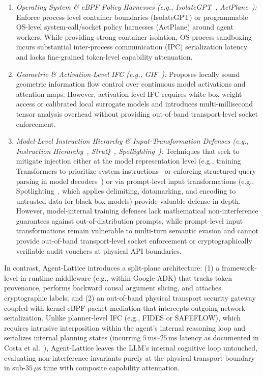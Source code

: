 \documentclass[conference,10pt]{IEEEtran}
\begin{document}
\begin{itemize}
\begin{enumerate}
        \item \textit{Operating System \& eBPF Policy Harnesses (e.g., IsolateGPT~\cite{isolategpt2025}, ActPlane~\cite{zheng2026actplane}):} Enforce process-level container boundaries (IsolateGPT) or programmable OS-level system-call/socket policy harnesses (ActPlane) around agent workers. While providing strong container isolation, OS process sandboxing incurs substantial inter-process communication (IPC) serialization latency and lacks fine-grained token-level capability attenuation.
        \item \textit{Geometric \& Activation-Level IFC (e.g., GIF~\cite{storek2026gif}):} Proposes locally sound geometric information flow control over continuous model activations and attention maps. However, activation-level IFC requires white-box weight access or calibrated local surrogate models and introduces multi-millisecond tensor analysis overhead without providing out-of-band transport-level socket enforcement.
        \item \textit{Model-Level Instruction Hierarchy \& Input-Transformation Defenses (e.g., Instruction Hierarchy~\cite{wallace2024instruction}, StruQ~\cite{chen2024struq}, Spotlighting~\cite{hines2024spotlighting}):} Techniques that seek to mitigate injection either at the model representation level (e.g., training Transformers to prioritize system instructions~\cite{wallace2024instruction} or enforcing structured query parsing in model decoders~\cite{chen2024struq}) or via prompt-level input transformations (e.g., Spotlighting~\cite{hines2024spotlighting}, which applies delimiting, datamarking, and encoding to untrusted data for black-box models) provide valuable defense-in-depth. However, model-internal training defenses lack mathematical non-interference guarantees against out-of-distribution prompts, while prompt-level input transformations remain vulnerable to multi-turn semantic evasion and cannot provide out-of-band transport-level socket enforcement or cryptographically verifiable audit vouchers at physical API boundaries.
    \end{enumerate}
    In contrast, Agent-Lattice introduces a split-plane architecture: (1) a framework-level in-runtime middleware (e.g., within Google ADK) that tracks token provenance, performs backward causal argument slicing, and attaches cryptographic labels; and (2) an out-of-band physical transport security gateway coupled with kernel eBPF packet mediation that intercepts outgoing network serialization. Unlike planner-level IFC (e.g., FIDES or SAFEFLOW), which requires intrusive interposition within the agent's internal reasoning loop and serializes internal planning states (incurring $5\,\text{ms}$--$25\,\text{ms}$ latency as documented in Costa et al.~\cite{costa2025fides}), Agent-Lattice leaves the LLM's internal cognitive loop untouched, evaluating non-interference invariants purely at the physical transport boundary in sub-$35\,\mu\text{s}$ time with composite capability attenuation.
\end{itemize}
\end{document}
